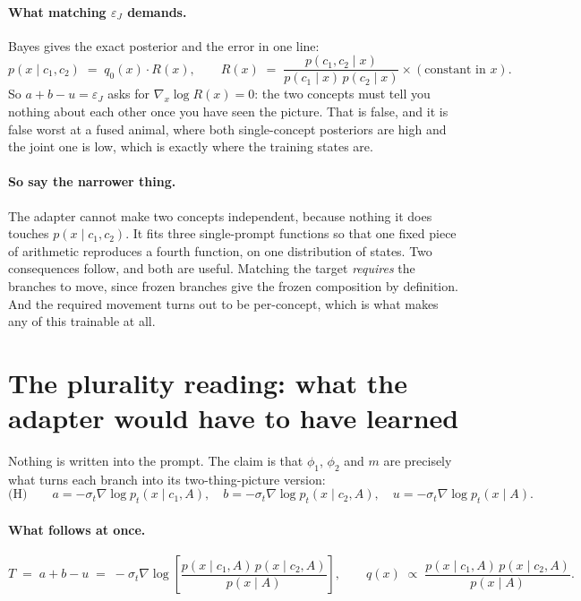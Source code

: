 \documentclass[11pt]{article}
\newcommand{\eps}{\varepsilon}
\begin{document}
\paragraph{What matching $\eps_J$ demands.}
Bayes gives the exact posterior and the error in one line:
\begin{equation}
  p(x \mid c_1, c_2) \;=\; q_0(x)\cdot R(x),
  \qquad
  R(x) \;=\; \frac{p(c_1,c_2\mid x)}{p(c_1\mid x)\,p(c_2\mid x)}\times(\text{constant in }x).
  \label{eq:R}
\end{equation}
So $a + b - u = \eps_J$ asks for $\nabla_x \log R(x) = 0$: the two concepts must tell you nothing
about each other once you have seen the picture. That is false, and it is false worst at a fused
animal, where both single-concept posteriors are high and the joint one is low, which is exactly
where the training states are.

\paragraph{So say the narrower thing.}
The adapter cannot make two concepts independent, because nothing it does touches
$p(x\mid c_1,c_2)$. It fits three single-prompt functions so that one fixed piece of arithmetic
reproduces a fourth function, on one distribution of states. Two consequences follow, and both are
useful. Matching the target \emph{requires} the branches to move, since frozen branches give the
frozen composition by definition. And the required movement turns out to be per-concept, which is
what makes any of this trainable at all.

\section{The plurality reading: what the adapter would have to have learned}
\label{sec:plurality}

Nothing is written into the prompt. The claim is that $\phi_1$, $\phi_2$ and $m$ are precisely what
turns each branch into its two-thing-picture version:
\begin{equation}
  \text{(H)}\qquad
  a = -\sigma_t \nabla \log p_t(x\mid c_1, A),
  \quad
  b = -\sigma_t \nabla \log p_t(x\mid c_2, A),
  \quad
  u = -\sigma_t \nabla \log p_t(x\mid A).
  \label{eq:H}
\end{equation}

\paragraph{What follows at once.}
\begin{equation}
  T \;=\; a+b-u \;=\; -\sigma_t \nabla \log\!\left[
  \frac{p(x\mid c_1,A)\,p(x\mid c_2,A)}{p(x\mid A)}\right],
  \qquad
  q(x) \;\propto\; \frac{p(x\mid c_1,A)\,p(x\mid c_2,A)}{p(x\mid A)} .
  \label{eq:q}
\end{equation}
\end{document}
